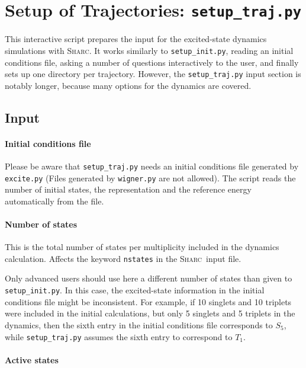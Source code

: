 \documentclass[a4paper,11pt,DIV=15,openany,twoside=false]{scrbook}
\newcommand{\sharc}{\textsc{Sharc}}
\newcommand{\ttt}[1]{\texttt{#1}}
\begin{document}
\section{Setup of Trajectories: \ttt{setup\_traj.py}}\label{sec:setup_traj.py}

This interactive script prepares the input for the excited-state dynamics simulations with \sharc. It works similarly to \ttt{setup\_init.py}, reading an initial conditions file, asking a number of questions interactively to the user, and finally sets up one directory per trajectory. However, the \ttt{setup\_traj.py} input section is notably longer, because many options for the dynamics are covered.

\subsection{Input}

\paragraph{Initial conditions file}

Please be aware that \ttt{setup\_traj.py} needs an initial conditions file generated by \ttt{excite.py} (Files generated by \ttt{wigner.py} are not allowed). The script reads the number of initial states, the representation and the reference energy automatically from the file.

\paragraph{Number of states}

This is the total number of states per multiplicity included in the dynamics calculation. Affects the keyword \ttt{nstates} in the \sharc\ input file.

Only advanced users should use here a different number of states than given to \ttt{setup\_init.py}. In this case, the excited-state information in the initial conditions file might be inconsistent. For example, if 10 singlets and 10 triplets were included in the initial calculations, but only 5 singlets and 5 triplets in the dynamics, then the sixth entry in the initial conditions file corresponds to $S_5$, while \ttt{setup\_traj.py} assumes the sixth entry to correspond to $T_1$.

\paragraph{Active states}
\end{document}
